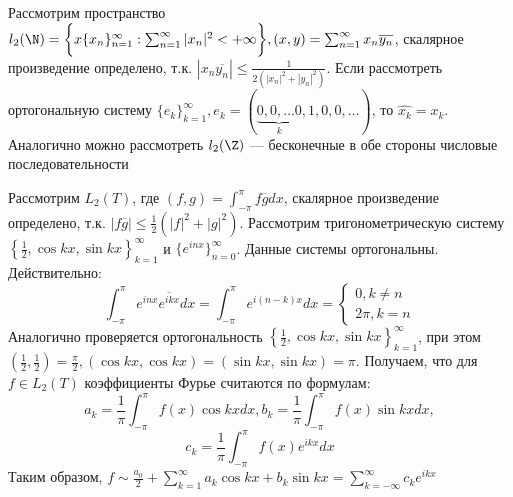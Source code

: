 
\begin{example}
    Рассмотрим пространство \(l_2(\N) = \bigg\{x \{x_n\}_{n = 1}^\infty: \sum_{n = 1}^\infty |x_n|^2 < +\infty\bigg\}, (x, y) = \sum_{n = 1}^\infty x_n \overline{y_n}\), скалярное произведение определено, т.к. \(|x_n\overline{y_n}| \le \frac{1}{2\left( |x_n|^2 + |y_n|^2 \right)}\). Если рассмотреть ортогональную систему \(\{e_k\}_{k = 1}^\infty, e_k = (\underbrace{0, 0, \dots 0}_{k}, 1, 0, 0, \dots)\), то \(\hat{x_k} = x_k\). Аналогично можно рассмотреть \(l_2(\Z)\) --- бесконечные в обе стороны числовые последовательности
\end{example}

\begin{example}
    Рассмотрим \(L_2(T)\), где \((f, g) = \int_{-\pi}^\pi f\overline{g} dx\), скалярное произведение определено, т.к. \(|f\overline{g}| \le \frac{1}{2}\left( |f|^2 + |g|^2 \right)\). Рассмотрим тригонометрическую систему \(\left\{ \frac{1}{2}, \cos kx, \sin kx \right\}_{k = 1}^\infty\) и \(\{e^{inx}\}_{n = 0}^\infty\). Данные системы ортогональны. Действительно:
    \[\int_{-\pi}^{\pi} e^{inx}\overline{e^{ikx}} dx = \int_{-\pi}^\pi e^{i(n - k)x} dx = \left\{\begin{array}{l}
        0, k \ne n \\
        2\pi, k = n
    \end{array}\right.\]
    Аналогично проверяется ортогональность \(\left\{ \frac{1}{2}, \cos kx, \sin kx \right\}_{k = 1}^\infty\), при этом \(\left( \frac{1}{2}, \frac{1}{2} \right) = \frac{\pi}{2}, (\cos kx, \cos kx) = (\sin kx, \sin kx) = \pi\). Получаем, что для \(f \in L_2(T)\) коэффициенты Фурье считаются по формулам:
    \[a_k = \frac{1}{\pi}\int_{-\pi}^\pi f(x)\cos kx dx, b_k = \frac{1}{\pi}\int_{-\pi}^\pi f(x)\sin kx dx, \]
    \[c_k = \frac{1}{\pi}\int_{-\pi}^\pi f(x)e^{ikx} dx\]
    Таким образом, \(f \sim \frac{a_0}{2} + \sum_{k = 1}^\infty a_k\cos kx + b_k\sin kx = \sum_{k = -\infty}^\infty c_ke^{ikx}\)
\end{example}

